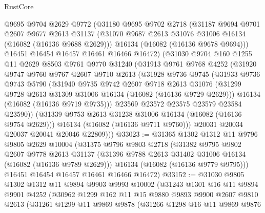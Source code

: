 \begin{lexlean}{RustCore}
\begin{coremodule}
      @9695
      @9704
      @2629
      @9772
      (@31180
        @9695
        @9702
        @2718
        (@31187
          @9694
          @9701
          @2607
          @9677
          @2613
          @31137
          (@31070 @9687 @2613 @31076 @31006 @16134 (@16082 (@16136 @9688 @2629)))
          @16134
          (@16082 (@16136 @9678 @9694)))
        @16451
        @16454
        @16457
        @16461
        @16466
        @16472)
      (@31030
        @9704
        @160
        @1255
        @11
        @2629
        @8503
        @9761
        @9770
        @31240
        (@31913
          @9761
          @9768
          @4252
          (@31920
            @9747
            @9760
            @9767
            @2607
            @9710
            @2613
            (@31928
              @9736
              @9745
              (@31933
                @9736
                @9743
                @5790
                (@31940
                  @9735
                  @9742
                  @2607
                  @9718
                  @2613
                  @31076
                  (@31299 @9728 @2613 @31309 @31006 @16134 (@16082 (@16136 @9729 @2629)))
                  @16134
                  (@16082 (@16136 @9719 @9735)))
                @23569
                @23572
                @23575
                @23579
                @23584
                @23590))
            (@31339 @9753 @2613 @31238 @31006 @16134 (@16082 (@16136 @9754 @2629)))
            @16134
            (@16082 (@16136 @9711 @9760)))
          @20031
          @20034
          @20037
          @20041
          @20046
          @22809)))
@33023 := @31365
    @1302
    @1312
    @11
    @9796
    @9805
    @2629
    @10004
    (@31375
      @9796
      @9803
      @2718
      (@31382
        @9795
        @9802
        @2607
        @9778
        @2613
        @31137
        (@31396 @9788 @2613 @31402 @31006 @16134 (@16082 (@16136 @9789 @2629)))
        @16134
        (@16082 (@16136 @9779 @9795)))
      @16451
      @16454
      @16457
      @16461
      @16466
      @16472)
@33152 := @31030
    @9805
    @1302
    @1312
    @11
    @9894
    @9903
    @9993
    @10002
    (@31243
      @1301
      @16
      @11
      @9894
      @9901
      @4252
      (@30962
        @1299
        @162
        @11
        @15
        @9880
        @9893
        @9900
        @2607
        @9810
        @2613
        (@31261
          @1299
          @11
          @9869
          @9878
          (@31266
            @1298
            @16
            @11
            @9869
            @9876

\end{coremodule}
\end{lexlean}

